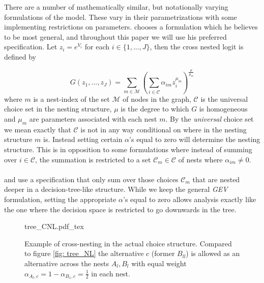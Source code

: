 There are a number of mathematically similar, but notationally varying formulations of the model. These vary in their parametrizations with some implementing restrictions on parameters. \citet{bierlaire_theoretical_2006} chooses a formulation which he believes to be most general, and throughout this paper we will use his preferred specification. Let $z_i =e^{V_i}$ for each $i\in\{1,...,J\}$, then the cross nested logit is defined by

  \begin{equation} \label{eq: G}
    G(z_1, ..., z_J) = \sum_{m\in\mathcal{M}} \left( \sum_{i\in\mathcal{C}} \alpha_{im} z_i^{\mu_m} \right)^{\frac{\mu}{\mu_m}}
  \end{equation}
where $m$ is a nest-index of the set $\mathcal{M}$ of nodes in the graph, $\mathcal{C}$ is the universal choice set in the nesting structure, $\mu$ is the degree to which $G$ is homogeneous and $\mu_m$ are parameters associated with each nest $m$. By the \textit{universal} choice set we mean exactly that $\mathcal{C}$ is not in any way conditional on where in the nesting structure $m$ is. Instead setting certain $\alpha$'s equal to zero will determine the nesting structure. This is in opposition to some formulations where instead of summing over $i\in\mathcal{C}$, the summation is restricted to a set $\mathcal{C}_m \in \mathcal{C}$ of nests where $\alpha_{im}\neq 0$.
\\ \\
\cite{train_discrete_2009} and \cite{jong_discrete_2014} use a specification that only sum over those choices $\mathcal{C}_m$ that are nested deeper in a decision-tree-like structure. While we keep the general \textit{GEV} formulation, setting the appropriate $\alpha$'s equal to zero allows analysis exactly like the one where the decision space is restricted to go downwards in the tree.

\begin{figure}[!h]
    \begin{center}
    \def\svgwidth{0.65\columnwidth}
    {tree_CNL.pdf_tex}
    \end{center}
    \caption[Example of cross-nesting in the actual choice structure.]{Example of cross-nesting in the actual choice structure. Compared to figure \ref{fig: tree_NL} the alternative $c$ (former $B_{ll}$) is allowed as an alternative across the nests $A_l,B_l$ with equal weight $\alpha_{A_l,c}=1-\alpha_{B_1,c}=\frac{1}{2}$ in each nest.}
    \label{fig: tree}
\end{figure}


